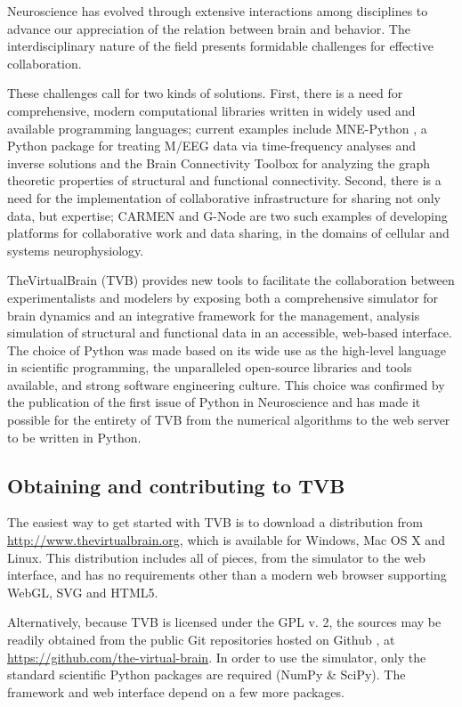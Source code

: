 \documentclass{bioinfo}
\begin{document}
Neuroscience has evolved through extensive interactions among disciplines
to advance our appreciation of the relation between brain and behavior.
The interdisciplinary nature of the field presents formidable challenges
for effective collaboration.

These challenges call for two kinds of solutions. First, there is a need for
comprehensive, modern computational libraries written in widely used and
available programming languages; current examples include MNE-Python
\citep{mnepython}, a Python package for treating M/EEG data via time-frequency
analyses and inverse solutions and the Brain Connectivity Toolbox
\citep{rubinov2010complex} for analyzing the graph theoretic properties of
structural and functional connectivity. Second, there is a need for the
implementation of collaborative infrastructure for sharing not only data, but
expertise; CARMEN \citep{austin2011carmen} and G-Node \citep{herz2008g} are two
such examples of developing platforms for collaborative work and data sharing,
in the domains of cellular and systems neurophysiology.

TheVirtualBrain (TVB) provides new tools to facilitate the collaboration
between experimentalists and modelers by exposing both a comprehensive
simulator for brain dynamics and an integrative framework for the management,
analysis simulation of structural and functional data in an accessible,
web-based interface. The choice of Python was made based on its wide use as the
high-level language in scientific programming, the unparalleled open-source
libraries and tools available, and strong software engineering culture.  This
choice was confirmed by the publication of the first issue of Python in
Neuroscience and has made it possible for the entirety of TVB from the
numerical algorithms to the web server to be written in Python.

\subsection{Obtaining and contributing to TVB}

The easiest way to get started with TVB is to download a distribution
from \url{http://www.thevirtualbrain.org}, which is available for Windows,
Mac OS X and Linux. This distribution includes
all of pieces, from the simulator to the web interface, and has no
requirements other than a modern web browser supporting WebGL, SVG and
HTML5.

Alternatively, because TVB is licensed under the GPL v. 2, the sources may be
readily obtained from the public Git repositories hosted on Github
\citep{dabbish2012social}, at 
\url{https://github.com/the-virtual-brain}. In order to use the simulator, 
only the standard scientific Python packages are required (NumPy \& SciPy).
The framework and web interface depend on a few more packages. 
\end{document}
